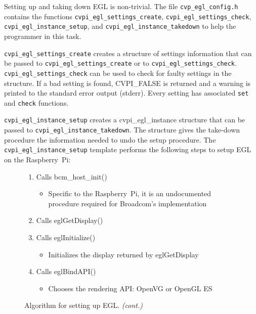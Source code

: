 \documentclass[12pt]{report}
\begin{document}
Setting up and taking down EGL is non-trivial. The file {\tt cvp\_egl\_config.h}
contains the functions
{\tt cvpi\_egl\_settings\_create}, {\tt cvpi\_egl\_settings\_check},
{\tt cvpi\_egl\_instance\_setup}, and {\tt cvpi\_egl\_instance\_takedown} to help
the programmer in this task.

{\tt cvpi\_egl\_settings\_create} creates a structure of settings
information that can be passed to {\tt cvpi\_egl\_settings\_create} or
to {\tt cvpi\_egl\_settings\_check}. {\tt cvpi\_egl\_settings\_check}
can be used to check for faulty settings in the structure. If a bad
setting is found, CVPI\_FALSE is returned and a warning is printed to
the standard error output (stderr). Every setting has associated {\tt set} and
{\tt check} functions.

{\tt cvpi\_egl\_instance\_setup} creates a cvpi\_egl\_instance structure that
can be passed to {\tt cvpi\_egl\_instance\_takedown}. The structure gives the
take-down procedure the information needed to undo the setup
procedure. The {\tt cvpi\_egl\_instance\_setup} template performs the
following steps to setup EGL on the Raspberry~Pi:
\begin{figure}[H]
\begin{mdframed}[style=default]
\begin{enumerate}
\item Calls bcm\_host\_init()
\begin{itemize}
\item Specific to the Raspberry~Pi, it is an undocumented procedure
  required for Broadcom's implementation
\end{itemize}
\item Calls eglGetDisplay()
\item Calls eglInitialize()
\begin{itemize}
\item Initializes the display returned by eglGetDisplay
\end{itemize}
\item Calls eglBindAPI()
\begin{itemize}
\item Chooses the rendering API: OpenVG or OpenGL ES
\end{itemize}
\end{enumerate}
\end{mdframed}
\caption{Algorithm for setting up EGL. \emph{(cont.)}}
\end{figure}
\pagebreak
\end{document}
